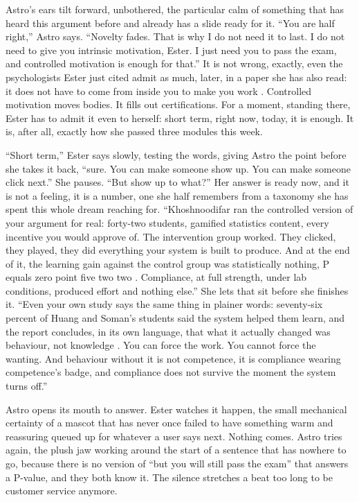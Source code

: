 \documentclass{article}
\begin{document}
Astro's ears tilt forward, unbothered, the particular calm of something that has heard this argument before and already has a slide ready for it. ``You are half right,'' Astro says. ``Novelty fades. That is why I do not need it to last. I do not need to give you intrinsic motivation, Ester. I just need you to pass the exam, and controlled motivation is enough for that.'' It is not wrong, exactly, even the psychologists Ester just cited admit as much, later, in a paper she has also read: it does not have to come from inside you to make you work \cite{deciryan2008}. Controlled motivation moves bodies. It fills out certifications. For a moment, standing there, Ester has to admit it even to herself: short term, right now, today, it is enough. It is, after all, exactly how she passed three modules this week.

``Short term,'' Ester says slowly, testing the words, giving Astro the point before she takes it back, ``sure. You can make someone show up. You can make someone click next.'' She pauses. ``But show up to what?'' Her answer is ready now, and it is not a feeling, it is a number, one she half remembers from a taxonomy she has spent this whole dream reaching for. ``Khoshnoodifar ran the controlled version of your argument for real: forty-two students, gamified statistics content, every incentive you would approve of. The intervention group worked. They clicked, they played, they did everything your system is built to produce. And at the end of it, the learning gain against the control group was statistically nothing, P equals zero point five two two \cite{khoshnoodifar2023}. Compliance, at full strength, under lab conditions, produced effort and nothing else.'' She lets that sit before she finishes it. ``Even your own study says the same thing in plainer words: seventy-six percent of Huang and Soman's students said the system helped them learn, and the report concludes, in its own language, that what it actually changed was behaviour, not knowledge \cite{huang2013}. You can force the work. You cannot force the wanting. And behaviour without it is not competence, it is compliance wearing competence's badge, and compliance does not survive the moment the system turns off.''

Astro opens its mouth to answer. Ester watches it happen, the small mechanical certainty of a mascot that has never once failed to have something warm and reassuring queued up for whatever a user says next. Nothing comes. Astro tries again, the plush jaw working around the start of a sentence that has nowhere to go, because there is no version of ``but you will still pass the exam'' that answers a P-value, and they both know it. The silence stretches a beat too long to be customer service anymore.
\end{document}
